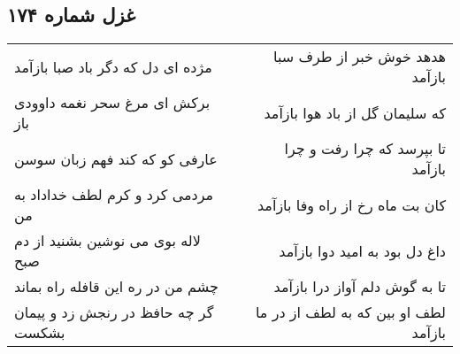 \begin{center}
\section*{غزل شماره ۱۷۴}
\label{sec:sh174}
\begin{longtable}{l p{0.5cm} r}
مژده ای دل که دگر باد صبا بازآمد
&&
هدهد خوش خبر از طرف سبا بازآمد
\\
برکش ای مرغ سحر نغمه داوودی باز
&&
که سلیمان گل از باد هوا بازآمد
\\
عارفی کو که کند فهم زبان سوسن
&&
تا بپرسد که چرا رفت و چرا بازآمد
\\
مردمی کرد و کرم لطف خداداد به من
&&
کان بت ماه رخ از راه وفا بازآمد
\\
لاله بوی می نوشین بشنید از دم صبح
&&
داغ دل بود به امید دوا بازآمد
\\
چشم من در ره این قافله راه بماند
&&
تا به گوش دلم آواز درا بازآمد
\\
گر چه حافظ در رنجش زد و پیمان بشکست
&&
لطف او بین که به لطف از در ما بازآمد
\\
\end{longtable}
\end{center}
